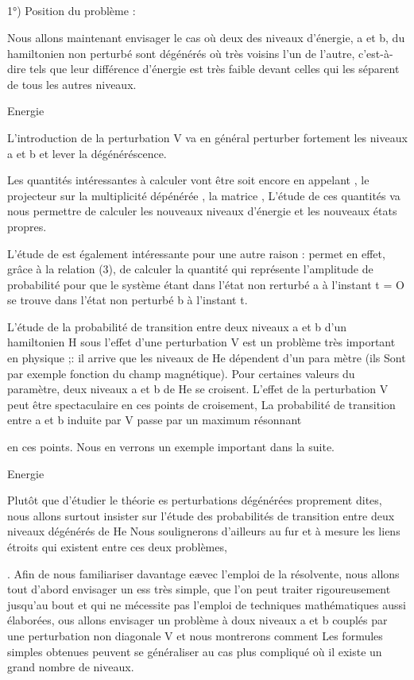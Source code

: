 \subsection{}%
1°) Position du problème :

Nous allons maintenant envisager le cas où deux des niveaux d'énergie, a et b, du hamiltonien non perturbé  sont dégénérés où très voisins l'un
de l'autre, c'est-à-dire tels que leur différence d'énergie est très faible devant
celles qui les séparent de tous les autres niveaux.

Energie

L'introduction de la perturbation V va en général perturber fortement
les niveaux a et b et lever la dégénéréscence.

Les quantités intéressantes à calculer vont être 
 soit encore en appelant , le projecteur sur la multiplicité
dépénérée , la matrice , L'étude de ces quantités va nous permettre
de calculer les nouveaux niveaux d'énergie et les nouveaux états propres.

L'étude de  est également intéressante pour une autre raison :
 permet en effet, grâce à la relation (3), de calculer la quantité
 qui représente l'amplitude de probabilité pour que le système étant
dans l'état non rerturbé a à l'instant t = O se trouve dans l'état non perturbé b à l'instant t.

L'étude de la probabilité de transition entre deux niveaux a et b
d'un hamiltonien H sous l'effet d'une perturbation V est un problème très
important en physique ;: il arrive que les niveaux de He dépendent d'un para
mètre  (ils Sont par exemple fonction du champ magnétique). Pour certaines
valeurs du paramètre, deux niveaux a et b de He se croisent. L'effet de la
perturbation V peut être spectaculaire en ces points de croisement, La probabilité de transition entre a et b induite par V passe par un maximum résonnant

en ces points. Nous en verrons un exemple important dans la suite.

Energie


Plutôt que d'étudier le théorie es perturbations dégénérées proprement dites, nous allons surtout insister sur l'étude des probabilités de
transition entre deux niveaux dégénérés de He Nous soulignerons d'ailleurs
au fur et à mesure les liens étroits qui existent entre ces deux problèmes,

. Afin de nous familiariser davantage eævec l'emploi de la résolvente,
nous allons tout d'abord envisager un ess très simple, que l'on peut traiter
rigoureusement jusqu'au bout et qui ne mécessite pas l'emploi de techniques
mathématiques aussi élaborées, ous allons envisager un problème à doux niveaux a et b couplés par une perturbation non diagonale V et nous montrerons
comment Les formules simples obtenues peuvent se généraliser au cas plus compliqué où il existe un grand nombre de niveaux.
